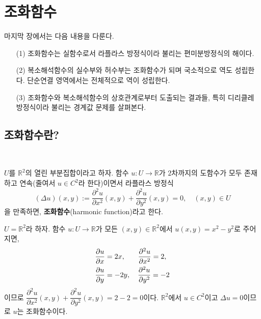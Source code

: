 
\chapter{조화함수}

마지막 장에서는 다음 내용을 다룬다.

\begin{itemize}
\item[(1)] 조화함수는 실함수로서 라플라스 방정식이라 불리는 편미분방정식의 해이다. 
\item[(2)] 복소해석함수의 실수부와 허수부는 조화함수가 되며
국소적으로 역도 성립한다. 단순연결 영역에서는 전체적으로 역이 성립한다.
\item[(3)] 조화함수와 복소해석함수의 상호관계로부터 도출되는 결과들, 특히
디리클레 방정식이라 불리는 경계값 문제를 살펴본다.
\end{itemize}

\section{조화함수란?}
\

\begin{saltdefinition}{}{} \label{def-5-1}
$U$를 $\mathbb R^2$의 열린 부분집합이라고 하자.
함수 $u:U \to \mathbb R$가
$2$차까지의 도함수가 모두 존재하고 연속(줄여서 $u\in C^2$라 한다)이면서
라플라스 방정식
\[
(\Delta u)(x,y) := \dfrac{\partial^2 u}{\partial x^2} (x,y) 
+ \dfrac{\partial^2 u}{\partial y^2} (x,y) = 0,
\quad
(x,y) \in U
\]
을 만족하면, {\bf 조화함수}(harmonic function)라고 한다.
\end{saltdefinition}

\begin{saltexample}[label=example-5-1]{}{}
$U=\mathbb R^2$라 하자.
함수 $u: U\to \mathbb R$가 모든 $(x,y)\in \mathbb R^2$에서
$u(x,y) = x^2-y^2$로 주어지면,
\begin{align*}
 &\dfrac{\partial u}{\partial x} = 2x, \hphantom{-} \quad  \dfrac{\partial^2 u}{\partial x^2} = 2, \\
 &\dfrac{\partial u}{\partial y} = -2y, \quad   \dfrac{\partial^2 u}{\partial y^2} = -2
\end{align*}
이므로 $\dfrac{\partial^2 u}{\partial x^2} (x,y) 
+ \dfrac{\partial^2 u}{\partial y^2} (x,y) = 2-2=0$이다.
$\mathbb R^2$에서 $u\in C^2$이고 $\Delta u=0$이므로 $u$는 조화함수이다.
\end{saltexample}


